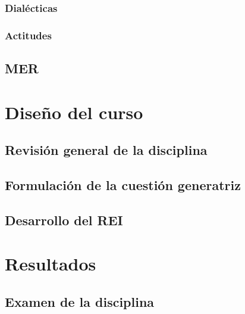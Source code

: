 \documentclass[spanish,]{book}
\begin{document}
\hypertarget{dialuxe9cticas}{%
\subsection{Dialécticas}\label{dialuxe9cticas}}

\hypertarget{actitudes}{%
\subsection{Actitudes}\label{actitudes}}

\hypertarget{mer}{%
\section{MER}\label{mer}}

\hypertarget{diseuxf1o-del-curso}{%
\chapter{Diseño del curso}\label{diseuxf1o-del-curso}}

\hypertarget{revisiuxf3n-general-de-la-disciplina}{%
\section{Revisión general de la disciplina}\label{revisiuxf3n-general-de-la-disciplina}}

\hypertarget{formulaciuxf3n-de-la-cuestiuxf3n-generatriz}{%
\section{Formulación de la cuestión generatriz}\label{formulaciuxf3n-de-la-cuestiuxf3n-generatriz}}

\hypertarget{desarrollo-del-rei}{%
\section{Desarrollo del REI}\label{desarrollo-del-rei}}

\hypertarget{resultados}{%
\chapter{Resultados}\label{resultados}}

\hypertarget{examen-de-la-disciplina}{%
\section{Examen de la disciplina}\label{examen-de-la-disciplina}}
\end{document}
